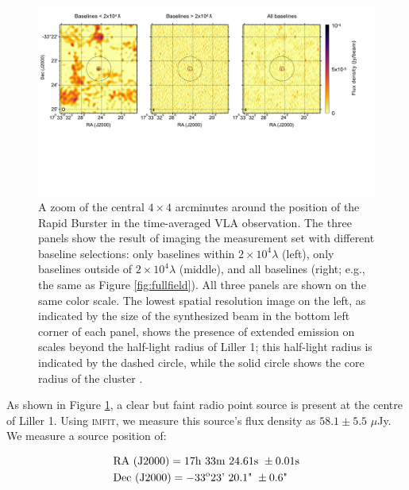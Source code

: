 \documentclass[fleqn,usenatbib]{mnras}
\begin{document}
\begin{figure}
\includegraphics[width=\textwidth]{combined_zoom.pdf}
 \caption{A zoom of the central $4\times4$ arcminutes around the position of the Rapid Burster in the time-averaged VLA observation. The three panels show the result of imaging the measurement set with different baseline selections: only baselines within $2\times10^4\lambda$ (left), only baselines outside of $2\times10^4\lambda$ (middle), and all baselines (right; e.g., the same as Figure \ref{fig:fullfield}). All three panels are shown on the same color scale. The lowest spatial resolution image on the left, as indicated by the size of the synthesized beam in the bottom left corner of each panel, shows the presence of extended emission on scales beyond the half-light radius of Liller 1; this half-light radius is indicated by the dashed circle, while the solid circle shows the core radius of the cluster \citep{tudor2022}.}

\label{fig:zooms}
\end{figure}

As shown in Figure \ref{fig:zooms}, a clear but faint radio point source is present at the centre of Liller 1. Using \textsc{imfit}, we measure this source's flux density as $58.1 \pm 5.5$ $\mu$Jy. We measure a source position of:

\begin{align*}
    &\text{RA (J2000)} = 17\text{h } 33\text{m } 24.61\text{s } \pm 0.01\text{s} \\
    &\text{Dec (J2000)} = -33^{\rm o} 23\text{' } 20.1\text{" } \pm 0.6\text{"}
\end{align*}
\end{document}
